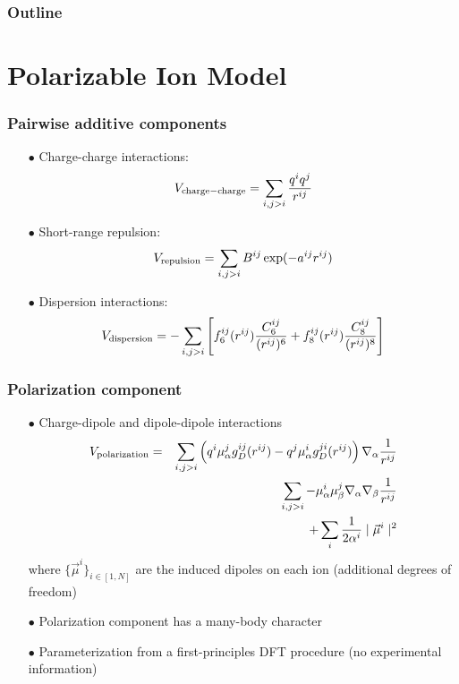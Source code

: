 \documentclass{beamer}
\begin{document}
\begin{frame}
  \frametitle{Outline}
  \tableofcontents
\end{frame}

\section{Polarizable Ion Model}
\begin{frame}
   \frametitle{Pairwise additive components}
   \begin{itemize}
      \item[$\bullet$] Charge-charge interactions:
            \[
            V_{\rm charge-charge}=\sum_{i, j > i}\frac{q^i q^j}{r^{ij}}
            \]
      \item[$\bullet$] Short-range repulsion:
            \[
            V_{\rm repulsion}=\sum_{i,j>i}B^{ij}\exp(-a^{ij}r^{ij})
            \]
      \item[$\bullet$] Dispersion interactions:
            \[
            V_{\rm dispersion}=-\sum_{i,j>i}\left[ f_6^{ij}(r^{ij})\frac{C_6^{ij}}{(r^{ij})^6}+f_8^{ij}(r^{ij})\frac{C_8^{ij}}{(r^{ij})^8}\right]
            \]
   \end{itemize}
\end{frame}
\begin{frame}
   \frametitle{Polarization component}
   \begin{itemize}
      \item[$\bullet$] Charge-dipole and dipole-dipole interactions
      \begin{eqnarray}
      V_{\rm polarization}&=& \sum_{i,j>i}\left( q^i \mu_\alpha^j g_D^{ij}(r^{ij})-q^j \mu_\alpha^i g_D^{ji}(r^{ij})\right) \nabla_\alpha \frac{1}{r^{ij}} \nonumber \\
                          & &\sum_{i,j>i} -\mu_\alpha^i \mu_\beta^j  \nabla_\alpha \nabla_\beta \frac{1}{r^{ij}}  \nonumber \\
                          & & +\sum_{i}\frac{1}{2\alpha^i}\mid \vec{\mu}^i \mid^2 \nonumber
      \end{eqnarray}
      where $ \{ \vec{\mu}^i \}_{i\in[1,N]} $ are the induced dipoles on each ion (\alert{additional degrees of freedom})
      \item[$\bullet$] Polarization component has a many-body character
      \item[$\bullet$] Parameterization from a first-principles DFT procedure (no experimental information)
   \end{itemize}
\end{frame}
\end{document}
